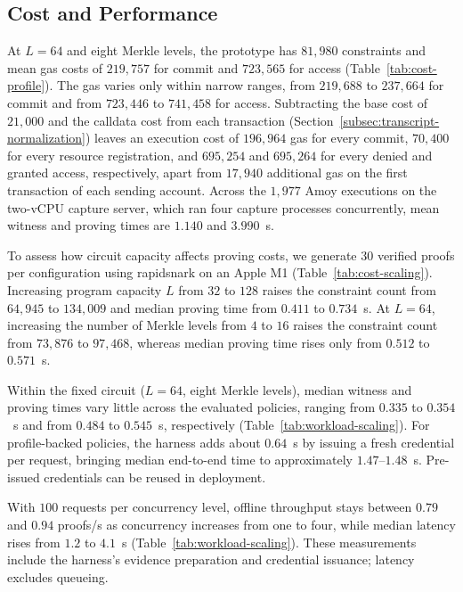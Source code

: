 \subsection{Cost and Performance}
\label{sec:eval-performance}


At $L=64$ and eight Merkle levels, the prototype has $81{,}980$ constraints and mean gas costs of $219{,}757$ for commit and $723{,}565$ for access (Table~\ref{tab:cost-profile}).
The gas varies only within narrow ranges, from $219{,}688$ to $237{,}664$ for commit and from $723{,}446$ to $741{,}458$ for access.
Subtracting the base cost of $21{,}000$ and the calldata cost from each transaction (Section~\ref{subsec:transcript-normalization}) leaves an execution cost of $196{,}964$ gas for every commit, $70{,}400$ for every resource registration, and $695{,}254$ and $695{,}264$ for every denied and granted access, respectively, apart from $17{,}940$ additional gas on the first transaction of each sending account.
Across the $1{,}977$ Amoy executions on the two-vCPU capture server, which ran four capture processes concurrently, mean witness and proving times are $1.140$ and $3.990$~s.


To assess how circuit capacity affects proving costs, we generate $30$ verified proofs per configuration using rapidsnark on an Apple M1 (Table~\ref{tab:cost-scaling}).
Increasing program capacity $L$ from $32$ to $128$ raises the constraint count from $64{,}945$ to $134{,}009$ and median proving time from $0.411$ to $0.734$~s.
At $L=64$, increasing the number of Merkle levels from $4$ to $16$ raises the constraint count from $73{,}876$ to $97{,}468$, whereas median proving time rises only from $0.512$ to $0.571$~s.




Within the fixed circuit ($L=64$, eight Merkle levels), median witness and proving times vary little across the evaluated policies, ranging from $0.335$ to $0.354$~s and from $0.484$ to $0.545$~s, respectively (Table~\ref{tab:workload-scaling}).
For profile-backed policies, the harness adds about $0.64$~s by issuing a fresh credential per request, bringing median end-to-end time to approximately $1.47$--$1.48$~s.
Pre-issued credentials can be reused in deployment.

With $100$ requests per concurrency level, offline throughput stays between $0.79$ and $0.94$ proofs/s as concurrency increases from one to four, while median latency rises from $1.2$ to $4.1$~s (Table~\ref{tab:workload-scaling}).
These measurements include the harness's evidence preparation and credential issuance; latency excludes queueing.

